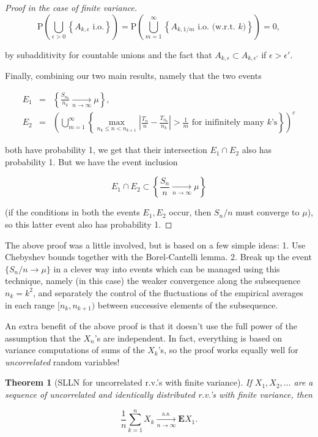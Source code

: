 \documentclass[11pt]{report}
\theoremstyle{plain}
\newtheorem{thm}{Theorem}[chapter]
\theoremstyle{definition}
\begin{document}
\begin{proof}[Proof in the case of finite variance]
\[
\mathrm{P}\left(\bigcup_{\epsilon>0} \left\{ A_{k,\epsilon}\textrm{ i.o.} \right\} \right) =
\mathrm{P}\left( \bigcup_{m=1}^\infty \left\{ A_{k,1/m}\textrm{ i.o. (w.r.t. } k \textrm{)}\right\} \right) = 0,
\]

\noindent by subadditivity for countable unions and the fact
that $A_{k,\epsilon} \subset A_{k,\epsilon'}$ if
$\epsilon>\epsilon'$.

Finally, combining our two main results, namely that
the two events

\begin{eqnarray*}
E_1 &=& \left\{ \frac{S_{n_k}}{n_k} \xrightarrow[n\to\infty]{} \mu \right\},
\\
E_2 &=& \left( \bigcup_{m=1}^\infty \left\{
\max_{n_k\le n< n_{k+1}} \left|\frac{T_n}{n}-\frac{T_{n_k}}{n_k} \right| > \frac{1}{m}
\textrm{ for inifinitely many } k \textrm{'s}
\right\}
\right)^c
\end{eqnarray*}

\noindent both have probability 1, we get that their
intersection $E_1\cap E_2$ also has probability 1.
But we have the event inclusion

\[
E_1 \cap E_2 \subset \left\{ \frac{S_n}{n} \xrightarrow[n\to\infty]{} \mu \right\}
\]

\noindent (if the conditions in both the events $E_1, E_2$
occur, then $S_n/n$ must converge to $\mu$), so this
latter event also has probability 1.
\end{proof}

\noindent The above proof was a little involved, but is based
on a few simple ideas: 1. Use Chebyshev bounds
together with the Borel-Cantelli lemma. 2. Break up
the event $\{S_n/n\to \mu\}$ in a clever way into
events which can be managed using this technique,
namely (in this case) the weaker convergence along the
subsequence $n_k = k^2$, and separately the control
of the fluctuations of the empirical averages in each
range $[n_k,n_{k+1})$ between successive elements of
the subsequence.

An extra benefit of the above proof is that it
doesn't use the full power of the assumption that the
$X_n$'s are independent. In fact, everything is based
on variance computations of sums of the $X_k$'s, so
the proof works equally well for \emph{uncorrelated} random
variables!

\begin{thm}[SLLN for uncorrelated r.v.'s with finite variance]
If $X_1,X_2,\ldots$ are a sequence of uncorrelated
and identically distributed r.v.'s with finite
variance, then

\[
\frac{1}{n}\sum_{k=1}^n X_k \xrightarrow[n\to\infty]{\textrm{a.s.}} \mathbf{E} X_1.
\]

\end{thm}
\end{document}
